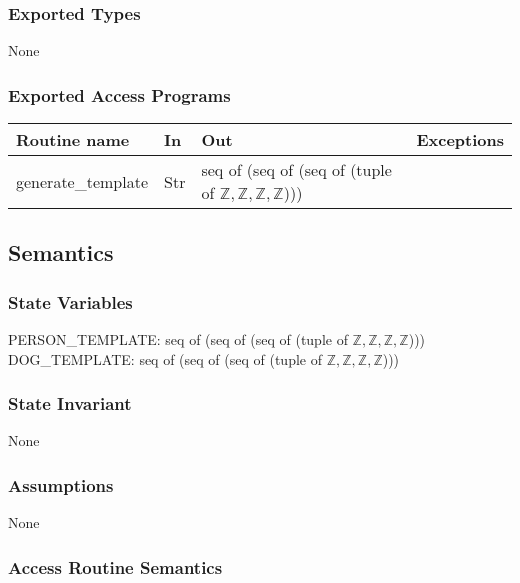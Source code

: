 \documentclass[12pt, titlepage]{article}
\begin{document}
\subsubsection* {Exported Types}

None

\subsubsection* {Exported Access Programs}

\begin{tabular}{| l | l | l | l |}
\hline
\textbf{Routine name} & \textbf{In} & \textbf{Out} & \textbf{Exceptions}\\
\hline
generate\_template & Str & seq of (seq of (seq of (tuple of $\mathbb{Z}, \mathbb{Z}, \mathbb{Z}, \mathbb{Z}$))) & \\

\hline
\end{tabular}

\subsection* {Semantics}

\subsubsection* {State Variables}

PERSON\_TEMPLATE: seq of (seq of (seq of (tuple of $\mathbb{Z}, \mathbb{Z}, \mathbb{Z}, \mathbb{Z}$))) \\
DOG\_TEMPLATE: seq of (seq of (seq of (tuple of $\mathbb{Z}, \mathbb{Z}, \mathbb{Z}, \mathbb{Z}$)))\\

\subsubsection* {State Invariant}

None

\subsubsection* {Assumptions}

None

\subsubsection* {Access Routine Semantics}
\end{document}

